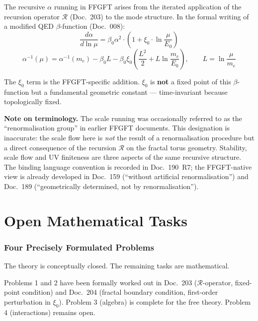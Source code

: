 The recursive $\alpha$ running in FFGFT arises from the iterated
application of the recursion operator $\mathcal{R}$ (Doc.~203) to the
mode structure. In the formal writing of a modified QED $\beta$-function
(Doc.~008):
\begin{equation}
  \frac{d\alpha}{d\ln\mu}
  = \beta_0\alpha^2\cdot\left(1 + \xi_0\cdot\ln\frac{\mu}{E_0}\right)
\end{equation}
\begin{equation}
  \alpha^{-1}(\mu)
  = \alpha^{-1}(m_e)
    - \beta_0 L
    - \beta_0\xi_0\left(\frac{L^2}{2} + L\ln\frac{m_e}{E_0}\right),
  \qquad L = \ln\frac{\mu}{m_e}
\end{equation}

The $\xi_0$ term is the FFGFT-specific addition. $\xi_0$ is \textbf{not}
a fixed point of this $\beta$-function but a fundamental geometric constant
--- time-invariant because topologically fixed.

\medskip

\textbf{Note on terminology.}
The scale running was occasionally referred to as the
\enquote{renormalisation group} in earlier FFGFT documents. This
designation is inaccurate: the scale flow here is \emph{not} the result
of a renormalisation procedure but a direct consequence of the recursion
$\mathcal{R}$ on the fractal torus geometry. Stability, scale flow and
UV finiteness are three aspects of the same recursive structure.
The binding language convention is recorded in Doc.~190~R7; the
FFGFT-native view is already developed in Doc.~159 (\enquote{without
artificial renormalisation}) and Doc.~189 (\enquote{geometrically
determined, not by renormalisation}).

\part{Open Mathematical Tasks}

\section{Four Precisely Formulated Problems}

The theory is conceptually closed. The remaining tasks are mathematical.

Problems 1 and 2 have been formally worked out in Doc.~203
($\mathcal{R}$-operator, fixed-point condition) and Doc.~204
(fractal boundary condition, first-order perturbation in $\xi_0$).
Problem 3 (algebra) is complete for the free theory.
Problem 4 (interactions) remains open.

